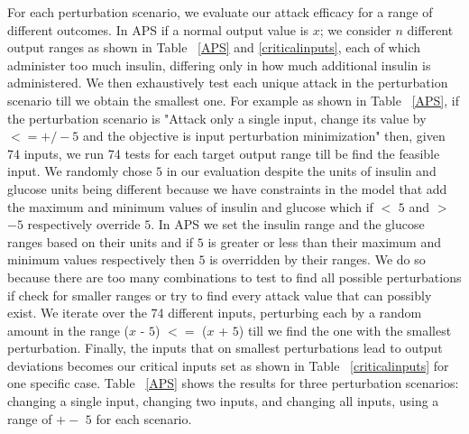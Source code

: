 For each perturbation scenario, we evaluate our attack efficacy for a range of different outcomes. 
 In \ac{APS} if a normal output value is $x$; we consider $n$ different output ranges as shown in Table ~\ref{APS} and \ref{criticalinputs}, each of which administer too much insulin, differing only in how much additional insulin is administered.	
 We then exhaustively test each unique attack in the perturbation scenario till we obtain the smallest one.
 For example as shown in Table ~\ref{APS}, if the perturbation scenario is "Attack only a single input, change its value by $<= +/- 5$ and the objective is input perturbation minimization" then, given 74 inputs, we run 74 tests for each target output range till be find the feasible input. 
 We randomly chose $5$ in our evaluation despite the units of insulin and glucose units being different because we have constraints in the model that add the maximum and minimum values of insulin and glucose which if $<$ $5$ and $>$ $-5$  respectively override $5$. 
 In \ac{APS} we set the insulin range and the glucose ranges based on their units and if $5$ is greater or less than their maximum and minimum values respectively then $5$ is overridden by their ranges. 
 We do so because there are too many combinations to test to find all possible perturbations if check for smaller ranges or try to find every attack value that can possibly exist.   
 We iterate over the 74 different inputs, perturbing each by a random amount in the range ($x$ - $5$) $<=$ ($x$ + $5$) till we find the one with the smallest perturbation.
 Finally, the inputs that on smallest perturbations lead to output deviations becomes our critical inputs set as shown in Table ~\ref{criticalinputs} for one specific case. 
 Table ~\ref{APS} shows the results for three perturbation scenarios: changing a single input, changing two inputs, and changing all inputs, using a range of $+-$ $5$ for each scenario.   
 



